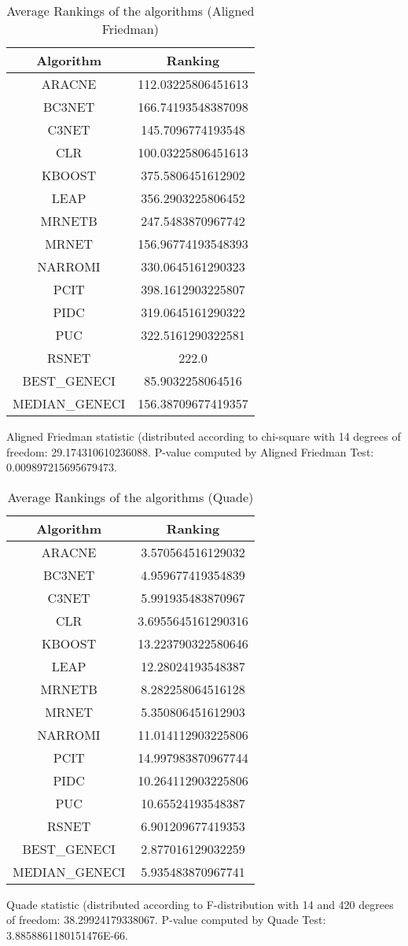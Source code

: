 \documentclass[a4paper,10pt]{article}
\begin{document}
\begin{landscape}
\begin{table}[!htp]
\centering
\caption{Average Rankings of the algorithms (Aligned Friedman)
}\begin{tabular}{c|c}
Algorithm&Ranking\\
\hline
ARACNE&112.03225806451613\\
BC3NET&166.74193548387098\\
C3NET&145.7096774193548\\
CLR&100.03225806451613\\
KBOOST&375.5806451612902\\
LEAP&356.2903225806452\\
MRNETB&247.5483870967742\\
MRNET&156.96774193548393\\
NARROMI&330.0645161290323\\
PCIT&398.1612903225807\\
PIDC&319.0645161290322\\
PUC&322.5161290322581\\
RSNET&222.0\\
BEST_GENECI&85.9032258064516\\
MEDIAN_GENECI&156.38709677419357\\
\end{tabular}
\end{table}


Aligned Friedman statistic (distributed according to chi-square with 14 degrees of freedom: 29.174310610236088. 
P-value computed by Aligned Friedman Test: 0.009897215695679473.\newline


\newpage

\begin{table}[!htp]
\centering
\caption{Average Rankings of the algorithms (Quade)
}\begin{tabular}{c|c}
Algorithm&Ranking\\
\hline
ARACNE&3.570564516129032\\
BC3NET&4.959677419354839\\
C3NET&5.991935483870967\\
CLR&3.6955645161290316\\
KBOOST&13.223790322580646\\
LEAP&12.28024193548387\\
MRNETB&8.282258064516128\\
MRNET&5.350806451612903\\
NARROMI&11.014112903225806\\
PCIT&14.997983870967744\\
PIDC&10.264112903225806\\
PUC&10.65524193548387\\
RSNET&6.901209677419353\\
BEST_GENECI&2.877016129032259\\
MEDIAN_GENECI&5.935483870967741\\
\end{tabular}
\end{table}
Quade statistic (distributed according to F-distribution with 14 and 420 degrees of freedom: 38.29924179338067. 
P-value computed by Quade Test: 3.8858861180151476E-66.\newline



\end{landscape}
\end{document}
